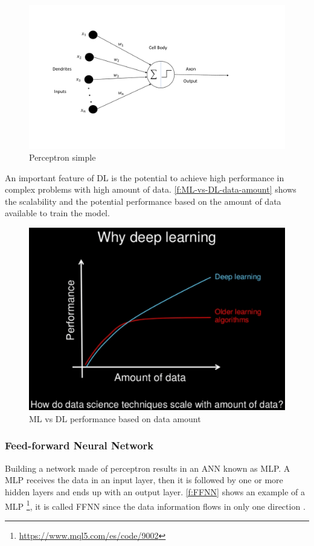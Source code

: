 \begin{figure}[h]
\centering
\includegraphics[width=\linewidth]{figures/Ch2/Perceptron.pdf}
\caption{Perceptron simple \cite{Pitalua2009}}
\label{f:Perceptron}
\end{figure}
 
An important feature of \ac{DL} is the potential to achieve high performance in complex problems with high amount of data. \autoref{f:ML-vs-DL-data-amount} shows the scalability and the potential performance based on the amount of data available to train the model.

\begin{figure}[h!]
\centering
\includegraphics[width=12cm]{figures/Ch2/MlvsDL-data-amount.png}
\caption{ML vs DL performance based on data amount}
\label{f:ML-vs-DL-data-amount}
\end{figure} 

\subsubsection{Feed-forward Neural Network}
Building a network made of perceptron results in an \ac{ANN} known as \ac{MLP}. A \ac{MLP} receives the data in an input layer, then it is followed by one or more hidden layers and ends up with an output layer.
\autoref{f:FFNN} shows an example of a \ac{MLP} \footnote{\url{https://www.mql5.com/es/code/9002}}, it is called \ac{FFNN} since the data information flows in only one direction \cite{geron2017}. 


